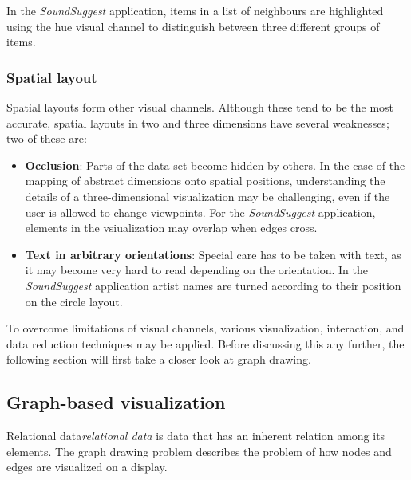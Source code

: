 In the \emph{SoundSuggest} application, items in a list of neighbours are highlighted using the hue visual channel to distinguish between three different groups of items.


\subsubsection{Spatial layout}

Spatial layouts form other visual channels. Although these tend to be the most accurate, spatial layouts in two and three dimensions have several weaknesses; two of these are\cite{shirley:2009}:

\begin{itemize}
	\item \textbf{Occlusion}: Parts of the data set become hidden by others. In the case of the mapping of abstract dimensions onto spatial positions, understanding the details of a three-dimensional visualization may be challenging, even if the user is allowed to change viewpoints. For the \emph{SoundSuggest} application, elements in the vsiualization may overlap when edges cross.
	\item \textbf{Text in arbitrary orientations}: Special care has to be taken with text, as it may become very hard to read depending on the orientation. In the \emph{SoundSuggest} application artist names are turned according to their position on the circle layout.
\end{itemize}


To overcome limitations of visual channels, various visualization, interaction, and data reduction techniques may be applied\cite{keim:2002, shirley:2009, ware:2004}. Before discussing this any further, the following section will first take a closer look at graph drawing.



\subsection{Graph-based visualization}\label{chapter:literature_study:section:interaction:subsection:graphs}

Relational data\emph{relational data} is data that has an inherent relation among its elements\cite{shirley:2009}. The graph drawing problem describes the problem of how nodes and edges are visualized on a display\cite{herman:2000}.

